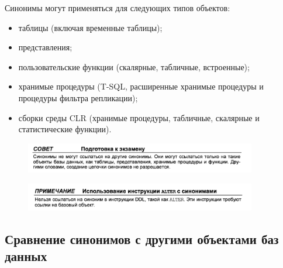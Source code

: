 Синонимы могут применяться для следующих типов объектов: 

\begin{itemize}
	\item таблицы (включая временные таблицы); 
	\item представления; 
	\item пользовательские функции (скалярные, табличные, встроенные); 
	\item хранимые процедуры (T-SQL, расширенные хранимые процедуры и процедуры
	фильтра репликации); 
	\item сборки среды CLR (хранимые процедуры, табличные, скалярные и статистические функции). 
\end{itemize}

\begin{figure}[h!]
	\begin{center}
		\includegraphics[width=0.9\textwidth]{img/advice19.png}
	\end{center}
	\captionsetup{justification=centering}
\end{figure}

\begin{figure}[h!]
	\begin{center}
		\includegraphics[width=0.9\textwidth]{img/advice20.png}
	\end{center}
	\captionsetup{justification=centering}
\end{figure}

\subsection{Сравнение синонимов
с другими объектами баз данных}

